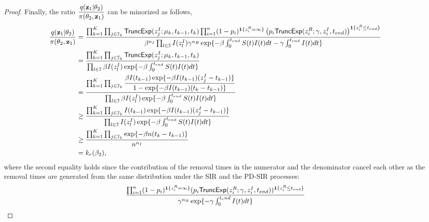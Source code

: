 \documentclass[11pt]{article}
\newcommand{\ram}[1]{{\color{green}{ #1}}}
\begin{document}
\begin{proof}
		Finally, the ratio $\dfrac{q(\mathbf{z}_1|\theta_2)}{\pi(\theta_2, \mathbf{z}_1)}$ can be minorized as follows, %
		\begin{align*}
		    \dfrac{q(\mathbf{z}_1|\theta_2)}{\pi(\theta_2, \mathbf{z}_1)} 
		    & = \dfrac{\prod_{k=1}^K \prod_{j\in \mathcal{I}_k} \textsf{TruncExp}(z^I_j; \mu_k, t_{k-1}, t_k) \prod_{i=1}^n (1-p_i)^{\mathbf{1}\{z^R_i=\infty\}} \left(p_i \textsf{TruncExp}(z^R_i;\gamma, z^I_i, t_{end})\right)^{\mathbf{1}\{z^R_i \le t_{end}\}}}
        	{\beta^{n_I} \prod_{l\in \mathcal{I}} I(z^I_l) \gamma^{n_R} \exp\{-\beta \int_0^{t_{end}} S(t)I(t)dt -\gamma \int_0^{t_{end}} I(t)dt\}} \\
        	& = \dfrac{\prod_{k=1}^K \prod_{j\in \mathcal{I}_k} \textsf{TruncExp}(z^I_j; \mu_k, t_{k-1}, t_k)}
        	{\prod_{l\in \mathcal{I}} \beta I(z^I_l) \exp\{-\beta \int_0^{t_{end}} S(t)I(t)dt\}}\\
        	& = \dfrac{\prod_{k=1}^K \prod_{j\in \mathcal{I}_k} \dfrac{\beta I(t_{k-1}) \exp\{-\beta I(t_{k-1}) (z^I_j - t_{k-1})\}}{1-\exp\{-\beta I(t_{k-1})(t_k - t_{k-1})\}}}
        	{\prod_{l\in \mathcal{I}} \beta I(z^I_l) \exp\{-\beta \int_0^{t_{end}} S(t)I(t)dt\}}\\
        	& \ge \dfrac{\prod_{k=1}^K \prod_{j\in \mathcal{I}_k} I(t_{k-1}) \exp\{-\beta I(t_{k-1}) (z^I_j - t_{k-1})\}}
        	{\prod_{l\in \mathcal{I}} I(z^I_l) \exp\{-\beta \int_0^{t_{end}} S(t)I(t)dt\}}\\
        	& \ge \dfrac{\prod_{k=1}^K \prod_{j\in \mathcal{I}_k} \exp\{-\beta n (t_k - t_{k-1})\}}
        	{n^{n_I}}\\
        	& = k_r(\beta_2),
		\end{align*}
		where the second equality holds since the contribution of the removal times in the numerator and the denominator cancel each other as the removal times are generated from the same distribution under the SIR and the PD-SIR processes:
        \begin{align*}
        	& \dfrac{\prod_{i=1}^n (1-p_i)^{\mathbf{1}\{z^R_i=\infty\}} (p_i \TruncExp(z^R_i;\gamma, z^I_i, t_{end}))^{\mathbf{1}\{z^R_i \le t_{end}\}}}{\gamma^{n_R} \exp\{- \gamma \int_0^{t_end} I(t)dt\}} \\

\end{align*}
\end{proof}
\end{document}
